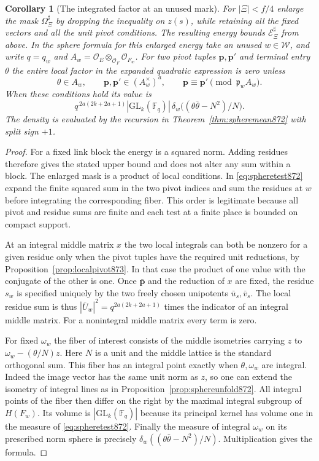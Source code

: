 \documentclass[a4paper,11pt]{article}
\newtheorem{corollary}[proposition]{Corollary}
\theoremstyle{definition}
\theoremstyle{remark}
\numberwithin{equation}{section}
\begin{document}
\begin{corollary}[The integrated factor at an unused mark]\leavevmode
\label{cor:integratedmark873}
For \(|\Xi|<f/4\) enlarge the mask \(\Omega_\Xi^\sharp\) by
dropping the inequality on \(z(s)\), while retaining all the
fixed vectors and all the unit pivot conditions. The resulting
energy bounds \(\mathcal E_\Xi^\sharp\) from above. In the
sphere formula for this enlarged energy take an unused
\(w\in\mathcal W\), and write \(q=q_w\) and
\(A_w=\mathcal O_E\otimes_{\mathcal O_F}\mathcal O_{F_w}\).
For two pivot tuples \(\mathbf p,\mathbf p'\) and terminal entry
\(\theta\) the entire local factor in the expanded quadratic
expression is zero unless
\[
    \theta\in A_w,\qquad
    \mathbf p,\mathbf p'\in(A_w^\times)^a,\qquad
    \mathbf p\equiv\mathbf p'\pmod{\mathfrak p_w A_w}.
\]
When these conditions hold its value is
\[
       q^{\,2a(2k+2a+1)}
          |\mathrm{GL}_k(\mathbb F_q)|\,
            \delta_w\big((\theta\bar\theta-N^2)/N\big).
\]
The density is evaluated by the recursion in
Theorem~\ref{thm:spheremean872} with split sign \(+1\).
\end{corollary}
\begin{proof}
For a fixed link block the energy is a squared norm. Adding
residues therefore gives the stated upper bound and does not
alter any sum within a block. The enlarged mask is a product
of local conditions. In \eqref{eq:spheretest872} expand the
finite squared sum in the two pivot indices and sum the
residues at \(w\) before integrating the corresponding fiber.
This order is legitimate because all pivot and residue sums
are finite and each test at a finite place is bounded on
compact support.

At an integral middle matrix \(x\) the two local integrals
can both be nonzero for a given residue only when the pivot
tuples have the required unit reductions, by
Proposition~\ref{prop:localpivot873}. In that case the product
of one value with the conjugate of the other is one. Once
\(\bar{\mathbf p}\) and the reduction of \(x\) are fixed, the
residue \(s_w\) is specified uniquely by the two freely chosen
unipotents \(\bar u_s,\bar v_s\). The local residue sum is thus
\(|\bar U_w|^2=q^{2a(2k+2a+1)}\) times the indicator of an
integral middle matrix. For a nonintegral middle matrix every
term is zero.

For fixed \(\omega_w\) the fiber of interest consists of the
middle isometries carrying \(z\) to \(\omega_w-(\theta/N)z\).
Here \(N\) is a unit and the middle lattice is the standard
orthogonal sum. This fiber has an integral point exactly when
\(\theta,\omega_w\) are integral. Indeed the image vector has
the same unit norm as \(z\), so one can extend the isometry
of integral lines as in Proposition~\ref{prop:sphereunfold872}.
All integral points of the fiber then differ on the right by
the maximal integral subgroup of \(H(F_w)\). Its volume is
\(|\mathrm{GL}_k(\mathbb F_q)|\) because its principal kernel
has volume one in the measure of \eqref{eq:spheretest872}.
Finally the measure of integral \(\omega_w\) on its prescribed
norm sphere is precisely \(\delta_w((\theta\bar\theta-N^2)/N)\).
Multiplication gives the formula.
\end{proof}
\end{document}

